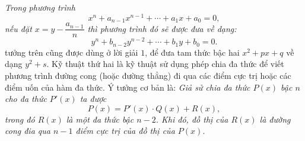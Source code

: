 \begin{bt}
{\begin{nx}
\begin{enumerate}
			\textit{Trong phương trình $$ x^n+a_{n-1}x^{n-1}+\cdots +a_1x+a_0=0,$$ nếu đặt $x=y-\dfrac{a_{n-1}}{n}$ thì phương trình đó sẽ được đưa về dạng: $$ y^n+b_{n-2}y^{n-2}+\cdots+b_1y+b_0=0.$$}
			 tưởng trên cũng được dùng ở lời giải $1$, để đưa tam thức bậc hai $x^2+px+q$ về dạng $y^2+s$.
			Kỹ thuật thứ hai là kỹ thuật sử dụng phép chia đa thức để viết phương trình đường cong (hoặc đường thẳng) đi qua các điểm cực trị hoặc các điểm uốn của hàm đa thức. Ý tưởng cơ bản là:
			\textit{Giả sử chia đa thức $P(x)$ bậc $n$ cho đa thức $P'(x)$ ta được $$ P(x)=P'(x)\cdot Q(x)+R(x),$$trong đó $R(x)$ là một đa thức bậc $n-2$.
				Khi đó, đồ thị của $R(x)$ là đường cong đia qua $n-1$ điểm cực trị của đồ thị của $P(x)$.}
		\end{enumerate}
	\end{nx}
	}
\end{bt}
